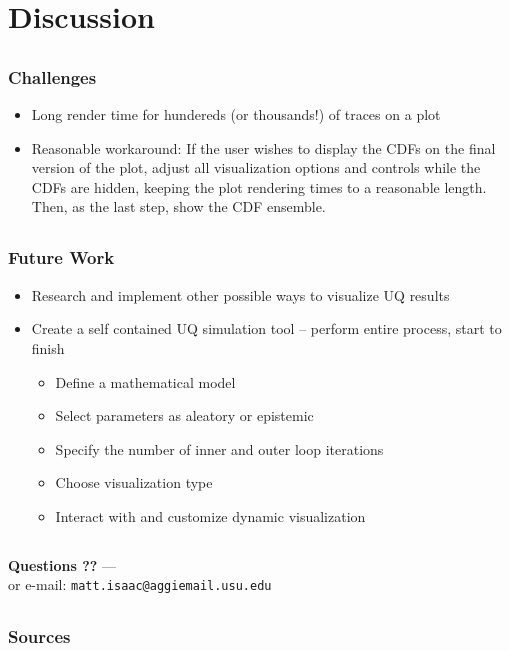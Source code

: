 \documentclass[handout, xcolor=dvipsnames]{beamer}
\begin{document}
\section{Discussion}  

\subsection{}
\begin{frame}
  \frametitle{Challenges}
  \begin{itemize}
    \item{Long render time for hundereds (or thousands!) of traces on a plot}
    \item{Reasonable workaround: If the user wishes to display the CDFs on the final version of the plot, adjust all visualization options and controls while the CDFs are hidden, keeping the plot rendering times to a reasonable length. Then, as the last step, show the CDF ensemble.}
  \end{itemize}
\end{frame}

\subsection{}
\begin{frame}
  \frametitle{Future Work}
    \begin{itemize}
      \item{Research and implement other possible ways to visualize UQ results}
      \item{Create a self contained UQ simulation tool -- perform entire process, start to finish}
      \begin{itemize}
        \item{Define a mathematical model}
        \item{Select parameters as aleatory or epistemic}
        \item{Specify the number of inner and outer loop iterations}
        \item{Choose visualization type}
        \item{Interact with and customize dynamic visualization}
      \end{itemize}
    \end{itemize}
\end{frame}
      
\subsection{}
\begin{frame}
	\frametitle{}
	\begin{center}
  {\large \bf Questions ??} --- \\[1cm]
    or e-mail: \tt{matt.isaac@aggiemail.usu.edu}
  \end{center}
\end{frame}

\subsection{}
\begin{frame}
	\frametitle{Sources}

	
	
  {\footnotesize
	}


\end{frame}
\end{document}

